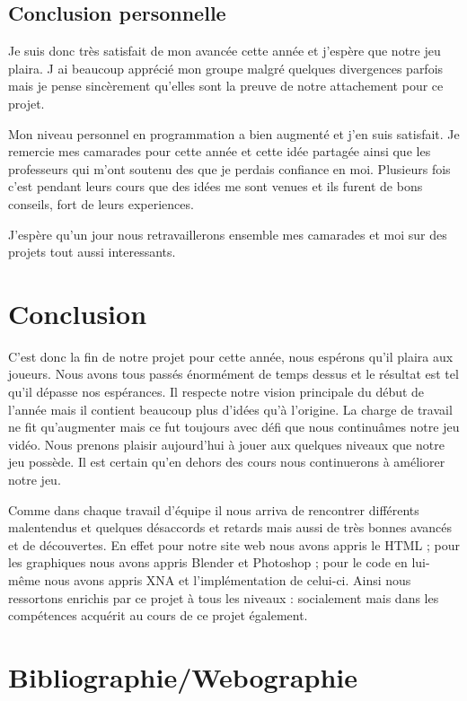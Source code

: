 \documentclass[12pt]{article}
\begin{document}
\newpage
\subsection{Conclusion personnelle}

Je suis donc très satisfait de mon avancée cette année et j'espère que notre jeu plaira. J ai beaucoup apprécié mon groupe malgré quelques divergences  parfois mais je pense sincèrement qu'elles sont la preuve de notre attachement pour ce projet.

Mon niveau personnel en programmation a bien augmenté et j'en suis satisfait. Je remercie mes camarades pour cette année et cette idée partagée ainsi que les professeurs qui m'ont soutenu des que je perdais confiance en moi. Plusieurs fois c'est pendant leurs cours que des idées me sont venues et ils furent de bons conseils, fort de leurs experiences.

 J'espère qu'un jour nous retravaillerons ensemble  mes camarades et moi sur des  projets tout aussi interessants.

\newpage

\section{Conclusion}

C’est donc la fin de notre projet pour cette année, nous espérons qu’il plaira aux joueurs. Nous avons tous passés énormément de temps dessus et le résultat est tel qu’il dépasse nos espérances. Il respecte notre vision principale du début de l’année mais il contient beaucoup plus d’idées qu’à l’origine. La charge de travail ne fit qu’augmenter mais ce fut toujours avec défi que nous continuâmes  notre jeu vidéo.  Nous prenons plaisir aujourd’hui à jouer aux quelques niveaux que notre jeu possède. Il est certain qu’en dehors des cours nous continuerons à améliorer notre jeu.

Comme dans chaque travail d’équipe il nous arriva de rencontrer différents malentendus et quelques désaccords et retards mais aussi de très bonnes avancés et de découvertes. En effet pour notre site web nous avons appris le HTML ; pour les graphiques nous avons appris Blender et Photoshop ; pour le code en lui-même nous avons appris XNA et l’implémentation de celui-ci. Ainsi nous ressortons enrichis par ce projet à tous les niveaux : socialement mais dans les compétences acquérit au cours de ce projet également.

\newpage
\section{Bibliographie/Webographie}
\end{document}
